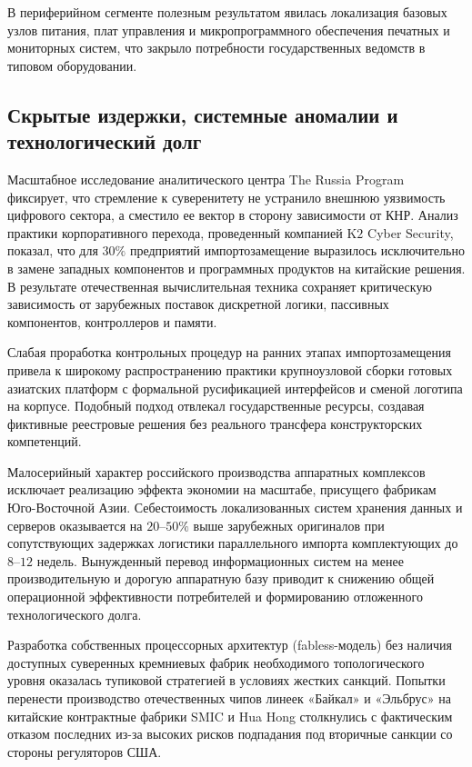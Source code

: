 \documentclass[12pt,a4paper]{article}
\begin{document}
В периферийном сегменте полезным результатом 
явилась локализация базовых узлов питания, плат управления и 
микропрограммного обеспечения печатных и мониторных систем, что 
закрыло потребности государственных ведомств в типовом оборудовании.

\subsection{Скрытые издержки, системные аномалии и технологический долг}

Масштабное исследование 
аналитического центра The Russia Program фиксирует, что стремление к 
суверенитету не устранило внешнюю уязвимость цифрового сектора, а 
сместило ее вектор в сторону зависимости от КНР. Анализ практики 
корпоративного перехода, проведенный компанией K$2$ Cyber Security, 
показал, что для $30\%$ предприятий импортозамещение выразилось 
исключительно в замене западных компонентов и программных продуктов 
на китайские решения. В результате отечественная вычислительная 
техника сохраняет критическую зависимость от зарубежных поставок 
дискретной логики, пассивных компонентов, контроллеров и памяти.

Слабая проработка контрольных процедур на ранних этапах 
импортозамещения привела к широкому распространению практики 
крупноузловой сборки готовых азиатских платформ с формальной 
русификацией интерфейсов и сменой логотипа на корпусе. Подобный 
подход отвлекал государственные ресурсы, создавая фиктивные 
реестровые решения без реального трансфера конструкторских компетенций.

Малосерийный характер российского производства аппаратных комплексов 
исключает реализацию эффекта экономии на масштабе, присущего фабрикам 
Юго-Восточной Азии. Себестоимость локализованных систем хранения 
данных и серверов оказывается на $20\text{--}50\%$ выше зарубежных 
оригиналов при сопутствующих задержках логистики параллельного 
импорта комплектующих до $8\text{--}12$ недель. Вынужденный перевод 
информационных систем на менее производительную и дорогую аппаратную 
базу приводит к снижению общей операционной эффективности потребителей 
и формированию отложенного технологического долга.

Разработка собственных процессорных архитектур (fabless-модель) без 
наличия доступных суверенных кремниевых фабрик необходимого 
топологического уровня оказалась тупиковой стратегией в условиях 
жестких санкций. Попытки перенести производство отечественных чипов 
линеек «Байкал» и «Эльбрус» на китайские контрактные фабрики SMIC и 
Hua Hong столкнулись с фактическим отказом последних из-за высоких 
рисков подпадания под вторичные санкции со стороны регуляторов США.
\end{document}
